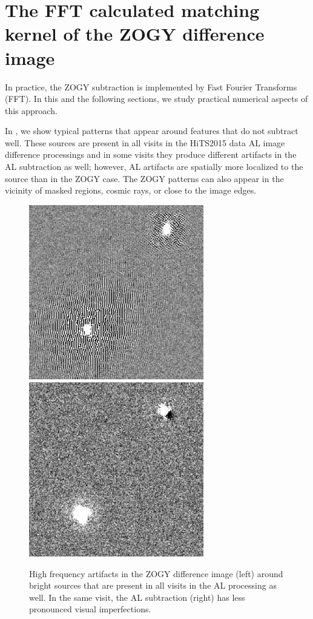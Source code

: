 \section{The FFT calculated matching kernel of the ZOGY difference image\label{sec:ZOGYFFT}}
%
\par In practice, the ZOGY subtraction is implemented by Fast Fourier
Transforms (FFT). In this and the following sections, we study
practical numerical aspects of this approach.
%
\par In , we show typical patterns that appear
around features that do not subtract well. These sources are present in all
visits in the HiTS2015 data AL image difference processings and in some
visits they produce different artifacts in the AL subtraction as well;
however, AL artifacts are spatially more localized to the source than in the
ZOGY case. The ZOGY patterns can also appear in the vicinity of masked
regions, cosmic rays, or close to the image edges.
%
\begin{figure}
\begin{center}
\includegraphics[width=3in]{fig/zogy_artifacts_v412060.png}
\includegraphics[width=3in]{fig/AL_goodvisit_v412060.png}
\end{center}
\caption{\label{fig:hits_zogy_artifacts}High frequency artifacts in the ZOGY
  difference image (left) around bright sources that are present in all
  visits in the AL processing as well. In the same visit, the AL subtraction
  (right) has less pronounced visual imperfections.}
\end{figure}
%
